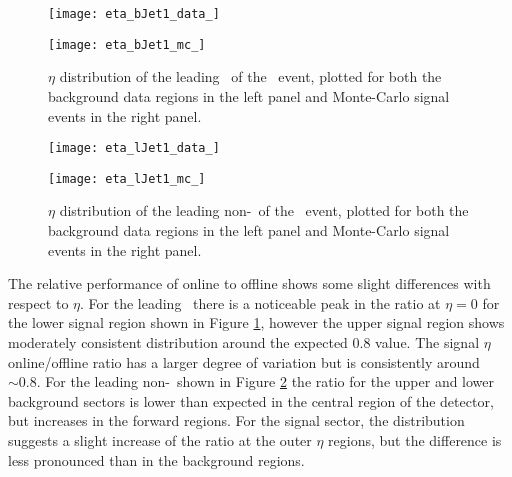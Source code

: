     \begin{figure}[h]
        \centering

        \begin{minipage}[h]{0.48\linewidth}
            \texttt{[image: eta\_bJet1\_data\_]}
        \end{minipage}
        \quad
        \begin{minipage}[h]{0.48\linewidth}
            \texttt{[image: eta\_bJet1\_mc\_]}
        \end{minipage}
        \caption[$\eta$ distribution of the leading \bjet\ of the \VBFHBB\ event]{$\eta$ distribution of the leading \bjet\ of the \VBFHBB\ event, plotted for both the background data regions in the left panel and Monte-Carlo signal events in the right panel.}
        \label{f:etab1}
    \end{figure}

    \begin{figure}[h]
        \centering
        \begin{minipage}[h]{0.48\linewidth}
            \texttt{[image: eta\_lJet1\_data\_]}
        \end{minipage}
        \quad
        \begin{minipage}[h]{0.48\linewidth}
            \texttt{[image: eta\_lJet1\_mc\_]}
        \end{minipage}
        \caption[$\eta$ distribution of the leading non-\bjet\ of the \VBFHBB\ event]{$\eta$ distribution of the leading non-\bjet\ of the \VBFHBB\ event, plotted for both the background data regions in the left panel and Monte-Carlo signal events in the right panel.}
        \label{f:etaj1}
    \end{figure}

    The relative performance of online to offline shows some slight differences with respect to $\eta$. For the leading \bjet\ there is a noticeable peak in the ratio at $\eta=0$ for the lower signal region shown in Figure \ref{f:etab1}, however the upper signal region shows moderately consistent distribution around the expected $0.8$ value. The signal $\eta$ online/offline ratio has a larger degree of variation but is consistently around $\sim0.8$. For the leading non-\bjet\ shown in Figure \ref{f:etaj1} the ratio for the upper and lower background sectors is lower than expected in the central region of the detector, but increases in the forward regions. For the signal sector, the distribution suggests a slight increase of the ratio at the outer $\eta$ regions, but the difference is less pronounced than in the background regions.

